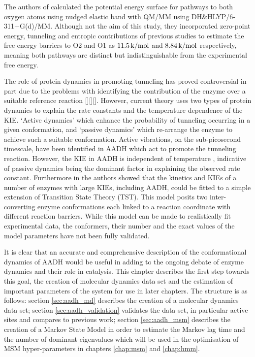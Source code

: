 The authors of \cite{ranaghanInitioQMMM2017} calculated the potential energy surface for pathways to both oxygen atoms using nudged elastic band with QM/MM using DH\&HLYP/6-311+G(d)/MM. Although not the aim of this study, they incorporated zero-point energy, tunneling and entropic contributions of previous studies \cite{masgrauAtomicDescriptionEnzyme2006}\cite{masgrauTunnelingClassicalPaths2007} to estimate the free energy barriers to O2 and O1 as $\SI{11.5}{\kilo\cal\per\mol}$ and $\SI{8.84}{\kilo\cal\per\mol}$ respectively, meaning both pathways are distinct but indistinguishable from the experimental free energy.  

The role of protein dynamics in promoting tunneling has proved controversial in part due to the problems with identifying the contribution of the enzyme over a suitable reference reaction [][][]. However, current theory \cite{kuznetsovProtonHydrogenAtom1999a}\cite{masgrau2004hydrogen} uses two types of protein dynamics to explain the rate constants and the temperature dependence of the KIE. `Active dynamics' which enhance the probability of tunneling occurring in a given conformation, and `passive dynamics' which re-arrange the enzyme to achieve such a suitable conformation. Active vibrations, on the sub-picosecond timescale,  have been identified in AADH \cite{johannissenEnzymeAromaticAmine2008}\cite{johannissenProtonTunnelingAromatic2007} which act to promote the tunneling reaction.  However, the KIE in AADH is independent of temperature \cite{masgrauAtomicDescriptionEnzyme2006}, indicative of passive dynamics being the dominant factor in explaining the observed rate constant. Furthermore in  \cite{glowackiProteinDynamicsEnzyme2012a}\cite{glowackiTakingOckhamRazor2012b} the authors showed that the kinetics and KIEs of a number of enzymes with large KIEs, including AADH, could be fitted to a simple extension of Transition State Theory (TST). This model posits two inter-converting enzyme conformations each linked to a reaction coordinate with different reaction barriers. While this model can be made to  realistically fit experimental data, the conformers, their number and the exact values of the model parameters have not been fully validated. 

It is clear that an accurate and comprehensive description of the conformational dynamics of AADH would be useful in adding to the ongoing debate of enzyme dynamics and their role in catalysis. This chapter describes the first step towards this goal, the creation of molecular dynamics data set and the estimation of important parameters of the system for use in later chapters. The structure is as follows: section \ref{sec:aadh_md} describes the creation of a molecular dynamics data set; section \ref{sec:aadh_validation} validates the data set, in particular active sites and compares to previous work; section \ref{sec:aadh_msm} describes the creation of a Markov State Model in order to estimate the Markov lag time and the number of dominant eigenvalues which will be used in the optimisation of MSM hyper-parameters in chapters \ref{chap:msm} and \ref{chap:hmm}. 

